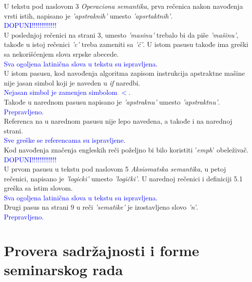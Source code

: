 \documentclass[a4paper]{report}
\newcommand{\odgovor}[1]{\textcolor{blue}{#1}}
\begin{document}
U tekstu pod naslovom 3 \emph{Operaciona semantika}, prva rečenica nakon navođenja vrsti istih, napisano je \emph{'apstraknih'} umesto \emph{'apsrtaktnih'}.\\
\odgovor{DOPUNI!!!!!!!!!!!!!}\\
U poslednjoj rečenici na strani 3, umesto \emph{'masinu'} trebalo bi da piše \emph{'mašinu'}, takođe u istoj rečenici \emph{'c'} treba zameniti sa \emph{'ć'}.
 U istom pasusu takođe ima greški sa nekorišćenjem slova srpske abecede.\\
\odgovor{Sva ogoljena latinična slova u tekstu su ispravljena.}\\
 U istom pasusu, kod navođenja algoritma zapisom instrukcija apstraktne mašine nije jasan simbol koji je naveden u \emph{if} naredbi. \\
\odgovor{Nejasan simbol je zamenjen simbolom $<$.}\\
 Takođe u narednom pasusu napisano je \emph{'apstraknu'} umesto \emph{'apstraktnu'}. \\
\odgovor{Prepravljeno.}\\
Referenca na u narednom pasusu nije lepo navedena, a takođe i na narednoj strani.\\
\odgovor{Sve greške se referencama su ispravljene.}\\ 
Kod navođenja značenja engleskih reči poželjno bi bilo koristiti '\emph{emph}' obeleživač.\\
\odgovor{DOPUNI!!!!!!!!!!!!!}\\

U prvom pasusu u tekstu pod naslovom 5 \emph{Aksiomatska semantika}, u petoj rečenici, napisano je \emph{'logicki'} umesto \emph{'logički'}.
 U narednoj rečenici i definiciji 5.1 greška sa istim slovom.\\
\odgovor{Sva ogoljena latinična slova u tekstu su ispravljena.}\\
  Drugi pasus na strani 9 u reči \emph{'sematike'} je izostavljeno slovo \emph{'n'}.\\
   \odgovor{Prepravljeno.}\\

\section{Provera sadržajnosti i forme seminarskog rada}
\end{document}
